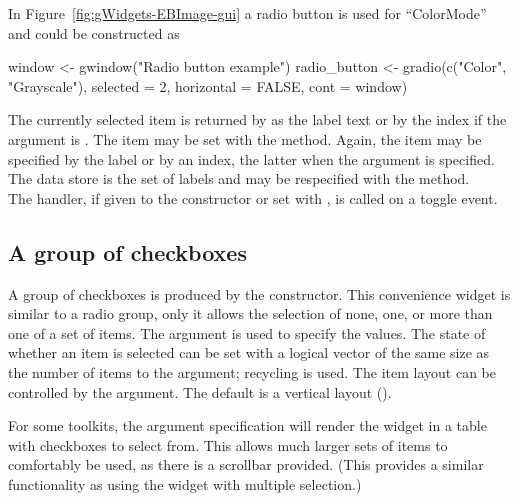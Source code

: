 In Figure~\ref{fig:gWidgets-EBImage-gui} a radio button is used for
``ColorMode''  and could be constructed as

\begin{Schunk}
\begin{Sinput}
 window <- gwindow("Radio button example")
 radio_button <- gradio(c("Color", "Grayscale"), selected = 2, 
                        horizontal = FALSE, cont = window)
\end{Sinput}
\end{Schunk}


The currently selected item is returned by  as
the label text or by the index if the argument  is
. The item may be set with the
 method. Again, the item may be
specified by the label or by an index, the latter when the argument
 is specified. 
\\

The data store is the set of labels and may be respecified with the
\method{[\ASSIGN}{gradio} method.
\\

The handler, if given to the constructor or set with
, is called on a toggle event.

\subsection{A group of checkboxes}
\label{sec:gWidgets-group-checkboxes}


A group of checkboxes is produced by the
 constructor. This convenience widget is
similar to a radio group, only it allows the selection of none, one,
or more than one of a set of items.  The
 argument is used to specify the
values. The state of whether an item is selected can be set with a
logical vector of the same size as the number of items to the
 argument; recycling is used. The
item layout can be controlled by the
 argument. The default is a
vertical layout ().


For some toolkits, the argument specification 
will render the widget in a table with checkboxes to select from. This
allows much larger sets of items to comfortably be used, as there is a
scrollbar provided. (This provides a similar functionality as using
the  widget with multiple selection.)



